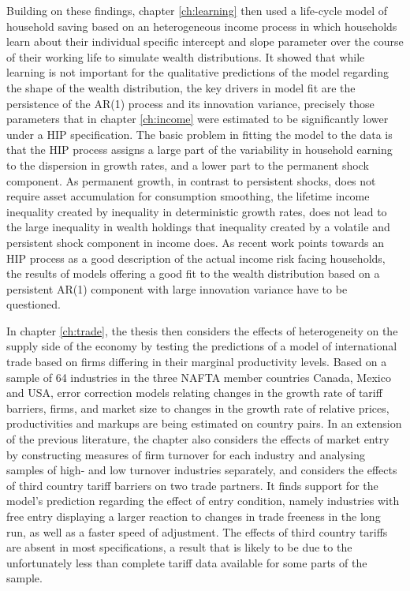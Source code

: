 Building on these findings, chapter \ref{ch:learning} then used a life-cycle
model of household saving based on an heterogeneous income process in which 
households learn about their individual specific intercept and slope parameter
over the course of their working life to simulate wealth distributions. It 
showed that while learning is not important for the qualitative predictions 
of the model regarding the shape of the wealth distribution, the key drivers
in model fit are the persistence of the AR(1) process and its innovation variance,
precisely those parameters that in chapter \ref{ch:income} were estimated to 
be significantly lower under a HIP specification. The basic problem in fitting 
the model to the data is that the HIP process assigns a large part of the 
variability in household earning to the dispersion in growth rates, and a lower
part to the permanent shock component. As permanent growth, in contrast to 
persistent shocks, does not require asset accumulation for consumption smoothing,
the lifetime income inequality created by inequality in deterministic growth 
rates, does not lead to the large inequality in wealth holdings that inequality
created by a volatile and persistent shock component in income does. As recent
work points towards an HIP process as a good description of the actual income 
risk facing households, the results of models offering a good fit to the wealth
distribution based on a persistent AR(1) component with large innovation variance
have to be questioned.

In chapter \ref{ch:trade}, the thesis then considers the effects of heterogeneity
on the supply side of the economy by testing the predictions of a model of 
international trade based on firms differing in their marginal productivity levels.
Based on a sample of 64 industries in the three NAFTA member countries Canada,
Mexico and USA, error correction models relating changes in the growth rate
of tariff barriers, firms, and market size to changes in the growth rate of relative
prices, productivities and markups are being estimated on country pairs. In an 
extension of the previous literature, the chapter also considers the effects of
market entry by constructing measures of firm turnover for each industry and 
analysing samples of high- and low turnover industries separately, and considers
the effects of third country tariff barriers on two trade partners. It finds
support for the model's prediction regarding the effect of entry condition, 
namely industries with free entry displaying a larger reaction to changes in 
trade freeness in the long run, as well as a faster speed of adjustment. The
effects of third country tariffs are absent in most specifications, a result
that is likely to be due to the unfortunately less than complete tariff data 
available for some parts of the sample. 

